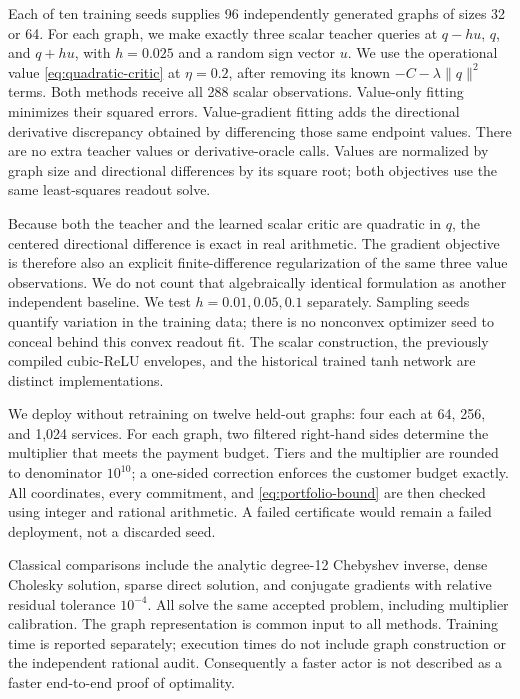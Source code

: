 Each of ten training seeds supplies 96 independently generated graphs of sizes 32 or 64. For each graph, we make exactly three scalar teacher queries at $q-hu$, $q$, and $q+hu$, with $h=0.025$ and a random sign vector $u$. We use the operational value \eqref{eq:quadratic-critic} at $\eta=0.2$, after removing its known $-C-\lambda\|q\|^2$ terms. Both methods receive all 288 scalar observations. Value-only fitting minimizes their squared errors. Value-gradient fitting adds the directional derivative discrepancy obtained by differencing those same endpoint values. There are no extra teacher values or derivative-oracle calls. Values are normalized by graph size and directional differences by its square root; both objectives use the same least-squares readout solve.

Because both the teacher and the learned scalar critic are quadratic in $q$, the centered directional difference is exact in real arithmetic. The gradient objective is therefore also an explicit finite-difference regularization of the same three value observations. We do not count that algebraically identical formulation as another independent baseline. We test $h=0.01,0.05,0.1$ separately. Sampling seeds quantify variation in the training data; there is no nonconvex optimizer seed to conceal behind this convex readout fit. The scalar construction, the previously compiled cubic-ReLU envelopes, and the historical trained tanh network are distinct implementations.

We deploy without retraining on twelve held-out graphs: four each at 64, 256, and 1,024 services. For each graph, two filtered right-hand sides determine the multiplier that meets the payment budget. Tiers and the multiplier are rounded to denominator $10^{10}$; a one-sided correction enforces the customer budget exactly. All coordinates, every commitment, and \eqref{eq:portfolio-bound} are then checked using integer and rational arithmetic. A failed certificate would remain a failed deployment, not a discarded seed.

Classical comparisons include the analytic degree-12 Chebyshev inverse, dense Cholesky solution, sparse direct solution, and conjugate gradients with relative residual tolerance $10^{-4}$. All solve the same accepted problem, including multiplier calibration. The graph representation is common input to all methods. Training time is reported separately; execution times do not include graph construction or the independent rational audit. Consequently a faster actor is not described as a faster end-to-end proof of optimality.


